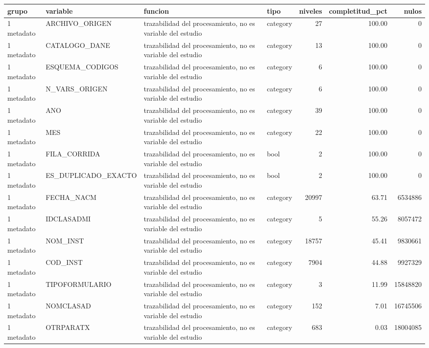 \begin{tabular}{llllrrr}
\toprule
grupo & variable & funcion & tipo & niveles & completitud\_pct & nulos \\
\midrule
1 metadato & ARCHIVO\_ORIGEN & trazabilidad del procesamiento, no es variable del estudio & category & 27 & 100.00 & 0 \\
1 metadato & CATALOGO\_DANE & trazabilidad del procesamiento, no es variable del estudio & category & 13 & 100.00 & 0 \\
1 metadato & ESQUEMA\_CODIGOS & trazabilidad del procesamiento, no es variable del estudio & category & 6 & 100.00 & 0 \\
1 metadato & N\_VARS\_ORIGEN & trazabilidad del procesamiento, no es variable del estudio & category & 6 & 100.00 & 0 \\
1 metadato & ANO & trazabilidad del procesamiento, no es variable del estudio & category & 39 & 100.00 & 0 \\
1 metadato & MES & trazabilidad del procesamiento, no es variable del estudio & category & 22 & 100.00 & 0 \\
1 metadato & FILA\_CORRIDA & trazabilidad del procesamiento, no es variable del estudio & bool & 2 & 100.00 & 0 \\
1 metadato & ES\_DUPLICADO\_EXACTO & trazabilidad del procesamiento, no es variable del estudio & bool & 2 & 100.00 & 0 \\
1 metadato & FECHA\_NACM & trazabilidad del procesamiento, no es variable del estudio & category & 20997 & 63.71 & 6534886 \\
1 metadato & IDCLASADMI & trazabilidad del procesamiento, no es variable del estudio & category & 5 & 55.26 & 8057472 \\
1 metadato & NOM\_INST & trazabilidad del procesamiento, no es variable del estudio & category & 18757 & 45.41 & 9830661 \\
1 metadato & COD\_INST & trazabilidad del procesamiento, no es variable del estudio & category & 7904 & 44.88 & 9927329 \\
1 metadato & TIPOFORMULARIO & trazabilidad del procesamiento, no es variable del estudio & category & 3 & 11.99 & 15848820 \\
1 metadato & NOMCLASAD & trazabilidad del procesamiento, no es variable del estudio & category & 152 & 7.01 & 16745506 \\
1 metadato & OTRPARATX & trazabilidad del procesamiento, no es variable del estudio & category & 683 & 0.03 & 18004085 \\

\end{tabular}
